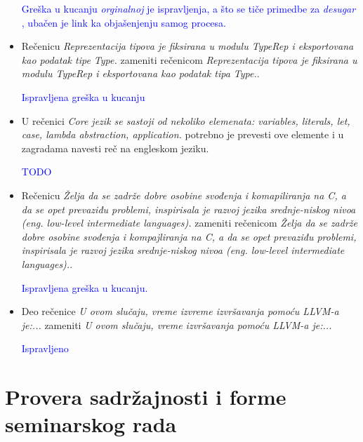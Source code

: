 \documentclass[a4paper]{report}
\newcommand{\odgovor}[1]{\textcolor{blue}{#1}}
\begin{document}
\begin{itemize}
\odgovor{Greška u kucanju \textit{orginalnoj} je ispravljenja, a što se tiče primedbe za \textit{desugar} , ubačen je link ka objašenjenju samog procesa.}

\item Rečenicu \textit{Reprezentacija tipova je fiksirana u modulu TypeRep i eksportovana kao podatak tipe Type.} zameniti rečenicom \textit{Reprezentacija tipova je fiksirana u modulu TypeRep i eksportovana kao podatak tipa Type.}.

\odgovor{Ispravljena greška u kucanju}

\item U rečenici \textit{Core jezik se sastoji od nekoliko elemenata: variables, literals, let, case, lambda abstraction, application.} potrebno je prevesti ove elemente i u zagradama navesti reč na engleskom jeziku.

\odgovor{TODO}

\item Rečenicu \textit{Želja da se zadrže dobre osobine svođenja i komapiliranja na C, a da se opet prevaziđu problemi, inspirisala je razvoj jezika srednje-niskog nivoa (eng. low-level intermediate languages).} zameniti rečenicom \textit{Želja da se zadrže dobre osobine svođenja i kompajliranja na C, a da se opet prevaziđu problemi, inspirisala je razvoj jezika srednje-niskog nivoa (eng. low-level intermediate languages).}.

\odgovor{Ispravljena greška u kucanju.}

\item Deo rečenice \textit{U ovom slučaju, vreme izvreme izvršavanja pomoću LLVM-a je:...} zameniti \textit{U ovom slučaju, vreme izvršavanja pomoću LLVM-a je:...}

\odgovor{Ispravljeno}

\end{itemize}


\section{Provera sadržajnosti i forme seminarskog rada}
\end{document}
